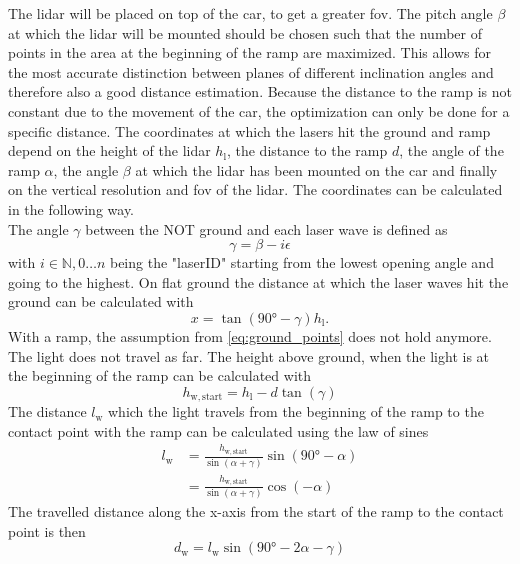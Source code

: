 The \gls{lidar} will be placed on top of the car, to get a greater \gls{fov}.
The pitch angle $\beta$ at which the \gls{lidar} will be mounted should be chosen such that the number of points in the area at the beginning of the ramp are maximized.
This allows for the most accurate distinction between planes of different inclination angles and therefore also a good distance estimation.
Because the distance to the ramp is not constant due to the movement of the car, the optimization can only be done for a specific distance.
The coordinates at which the lasers hit the ground and ramp depend on the height of the \gls{lidar} $h_\mathrm{l}$, the distance to the ramp $d$, the angle of the ramp $\alpha$, the angle $\beta$ at which the \gls{lidar} has been mounted on the car and finally on the vertical resolution and \gls{fov} of the \gls{lidar}.
The coordinates can be calculated in the following way.\\
The angle $\gamma$ between the NOT ground and each laser wave is defined as
\begin{equation}
	\gamma = \beta - i\epsilon
\end{equation}
with $i \in \mathbb{N}, 0\dots n$ being the "laserID" starting from the lowest opening angle and going to the highest.
On flat ground the distance at which the laser waves hit the ground can be calculated with
\begin{equation}
	x = \tan(\ang{90} - \gamma) h_\mathrm{l}.
	\label{eq:ground_points}
\end{equation}
With a ramp, the assumption from \ref{eq:ground_points} does not hold anymore.
The light does not travel as far.
The height above ground, when the light is at the beginning of the ramp can be calculated with
\begin{equation}
	h_\mathrm{w,start} = h_\mathrm{l} - d\tan(\gamma)
\end{equation}
The distance $l_\mathrm{w}$ which the light travels from the beginning of the ramp to the contact point with the ramp can be calculated using the law of sines
\begin{align}
	l_\mathrm{w} & = \frac{h_\mathrm{w,start} }{\sin(\alpha + \gamma)} \sin(\ang{90} - \alpha) \\
	             & = \frac{h_\mathrm{w,start} }{\sin(\alpha + \gamma)} \cos(-\alpha)
\end{align}
The travelled distance along the x-axis from the start of the ramp to the contact point is then
\begin{equation}
	d_\mathrm{w}  = l_\mathrm{w} \sin(\ang{90} - 2\alpha - \gamma)
\end{equation}

